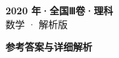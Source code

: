 \documentclass[zihao=-4, a4paper]{ctexart}
\begin{document}
\begin{center}
  {\Large\bfseries 2020 年·全国Ⅲ卷·理科}\\[4pt]
  {\large 数学 · 解析版}
\end{center}
\medskip
{}

\clearpage
{}
\begin{center}{\Large\bfseries 参考答案与详细解析}\end{center}
\medskip

\end{document}
